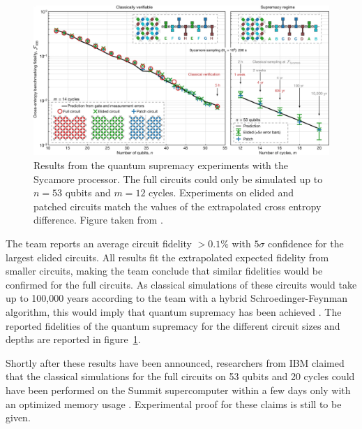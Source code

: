 \begin{figure}[H]
  \centering
  \includegraphics[width=\textwidth]{figures/supremacy_results}
  \caption[Cross Entropy Fidelity of the Sycamore Processor]{Results from the quantum supremacy experiments 
  with the Sycamore processor. The full circuits could only be simulated up to $n=53$ qubits and 
  $m=12$ cycles. Experiments on elided and patched circuits match the values of the extrapolated cross entropy difference.
  Figure taken from \cite{martines2019supremacy}.}
  \label{fig:supremacy_results}
\end{figure}

The team reports an average circuit fidelity $ > 0.1\%$ with $5\sigma$ confidence
for the largest elided circuits. All results fit the extrapolated expected
fidelity from smaller circuits, making the team conclude that similar fidelities
would be confirmed for the full circuits. As classical simulations of these
circuits would take up to 100,000 years according to the team with a hybrid
Schroedinger-Feynman algorithm, this would imply
that quantum supremacy has been achieved \cite{martines2019supremacy}. The reported fidelities of the quantum supremacy for
the different circuit sizes and depths are reported in figure~\ref{fig:supremacy_results}.

Shortly after these results have been announced, researchers from IBM claimed that the classical simulations
for the full circuits on 53 qubits and 20 cycles could have been performed
on the Summit supercomputer within a few days only with an optimized memory
usage \cite{pednault2019leveraging}. Experimental proof for these claims is still to be given.

